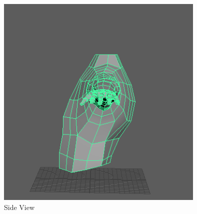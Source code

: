 \documentclass[a4paper]{article}
\begin{document}
\begin{figure}[h]
\centering
\includegraphics[width=10cm]{img/Side1.png}
\caption{Side View}
\label{fig:Side View}
\end{figure}
\end{document}
